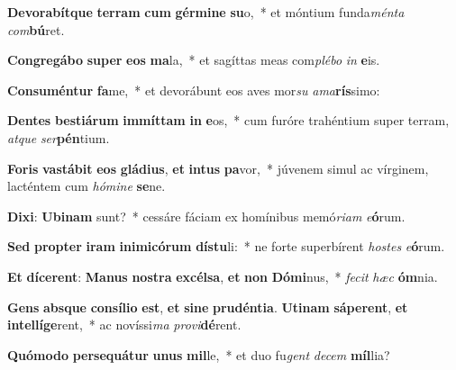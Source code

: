 \item \textbf{De}\textbf{vo}\textbf{ra}\textbf{bít}\textbf{que} \textbf{ter}\textbf{ram} \textbf{cum} \textbf{gér}\textbf{mi}\textbf{ne} \textbf{su}o,~* et móntium funda\textit{mén}\textit{ta} \textit{com}\textbf{bú}ret.
\item \textbf{Con}\textbf{gre}\textbf{gá}\textbf{bo} \textbf{su}\textbf{per} \textbf{e}\textbf{os} \textbf{ma}la,~* et sagíttas meas com\textit{plé}\textit{bo} \textit{in} \textbf{e}is.
\item \textbf{Con}\textbf{su}\textbf{mén}\textbf{tur} \textbf{fa}me,~* et devorábunt eos aves mor\textit{su} \textit{a}\textit{ma}\textbf{rís}simo:
\item \textbf{Den}\textbf{tes} \textbf{bes}\textbf{ti}\textbf{á}\textbf{rum} \textbf{im}\textbf{mít}\textbf{tam} \textbf{in} \textbf{e}os,~* cum furóre trahéntium super terram, \textit{at}\textit{que} \textit{ser}\textbf{pén}tium.
\item \textbf{Fo}\textbf{ris} \textbf{vas}\textbf{tá}\textbf{bit} \textbf{e}\textbf{os} \textbf{glá}\textbf{di}\textbf{us}, \textbf{et} \textbf{in}\textbf{tus} \textbf{pa}vor,~* júvenem simul ac vírginem, lacténtem cum \textit{hó}\textit{mi}\textit{ne} \textbf{se}ne.
\item \textbf{Di}\textbf{xi}: \textbf{U}\textbf{bi}\textbf{nam} sunt?~* cessáre fáciam ex homínibus memó\textit{ri}\textit{am} \textit{e}\textbf{ó}rum.
\item \textbf{Sed} \textbf{prop}\textbf{ter} \textbf{i}\textbf{ram} \textbf{in}\textbf{i}\textbf{mi}\textbf{có}\textbf{rum} \textbf{dís}\textbf{tu}li:~* ne forte superbírent \textit{hos}\textit{tes} \textit{e}\textbf{ó}rum.
\item \textbf{Et} \textbf{dí}\textbf{ce}\textbf{rent}: \textbf{Ma}\textbf{nus} \textbf{nos}\textbf{tra} \textbf{ex}\textbf{cél}\textbf{sa}, \textbf{et} \textbf{non} \textbf{Dó}\textbf{mi}nus,~* \textit{fe}\textit{cit} \textit{hæc} \textbf{óm}nia.
\item \textbf{Gens} \textbf{abs}\textbf{que} \textbf{con}\textbf{sí}\textbf{li}\textbf{o} \textbf{est}, \textbf{et} \textbf{si}\textbf{ne} \textbf{pru}\textbf{dén}\textbf{ti}\textbf{a}. \textbf{U}\textbf{ti}\textbf{nam} \textbf{sá}\textbf{pe}\textbf{rent}, \textbf{et} \textbf{in}\textbf{tel}\textbf{lí}\textbf{ge}rent,~* ac novíssi\textit{ma} \textit{pro}\textit{vi}\textbf{dé}rent.
\item \textbf{Quó}\textbf{mo}\textbf{do} \textbf{per}\textbf{se}\textbf{quá}\textbf{tur} \textbf{u}\textbf{nus} \textbf{mil}le,~* et duo fu\textit{gent} \textit{de}\textit{cem} \textbf{míl}lia?
